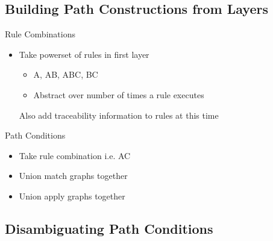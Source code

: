 \documentclass[xcolor=dvipsnames, 14pt]{beamer}
\begin{document}
\subsection{Building Path Constructions from Layers}

\begin{frame}{Rule Combinations}
\begin{itemize}
\item Take powerset of rules in first layer
\begin{itemize}
\item A, AB, ABC, BC
\item Abstract over number of times a rule executes
\end{itemize}
Also add traceability information to rules at this time
\end{itemize}

\end{frame}

\begin{frame}{Path Conditions}
\begin{itemize}
\item Take rule combination i.e. AC
\item Union match graphs together
\item Union apply graphs together
\end{itemize}

\end{frame}

\subsection{Disambiguating Path Conditions}
\end{document}
